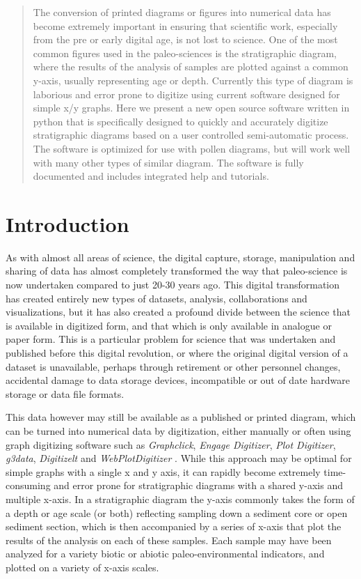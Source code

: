 \documentclass[
11pt, %
english, %
singlespacing, %
headsepline, %
]{MastersDoctoralThesis} %
\begin{document}
\begin{NoHyper}
\begin{refsection}
\setcounter{secnumdepth}{3}

\begin{abstract}
	The conversion of printed diagrams or figures into numerical data has become extremely important in ensuring that scientific work, especially from the pre or early digital age, is not lost to science. One of the most common figures used in the paleo-sciences is the stratigraphic diagram, where the results of the analysis of samples are plotted against a common y-axis, usually representing age or depth. Currently this type of diagram is laborious and error prone to digitize using current software designed for simple x/y graphs. Here we present a new open source software written in python that is specifically designed to quickly and accurately digitize stratigraphic diagrams based on a user controlled semi-automatic process. The software is optimized for use with pollen diagrams, but will work well with many other types of similar diagram. The software is fully documented and includes integrated help and tutorials. 
\end{abstract}

\section{Introduction}   \label{sec:straditize-intro}

As with almost all areas of science, the digital capture, storage, manipulation and sharing of data has almost completely transformed the way that paleo-science is now undertaken compared to just 20-30 years ago. This digital transformation has created entirely new types of datasets, analysis, collaborations and visualizations, but it has also created a profound divide between the science that is available in digitized form, and that which is only available in analogue or paper form. This is a particular problem for science that was undertaken and published before this digital revolution, or where the original digital version of a dataset is unavailable, perhaps through retirement or other personnel changes, accidental damage to data storage devices, incompatible or out of date hardware storage or data file formats. 

This data however may still be available as a published or printed diagram, which can be turned into numerical data by digitization, either manually or often using graph digitizing software such as \emph{Graphclick}, \emph{Engage Digitizer}, \emph{Plot Digitizer}, \emph{g3data}, \emph{Digitizelt} and \emph{WebPlotDigitizer} \citep{Rohatgi2019}. While this approach may be optimal for simple graphs with a single x and y axis, it can rapidly become extremely time-consuming and error prone for stratigraphic diagrams with a shared y-axis and multiple x-axis. In a stratigraphic diagram the y-axis commonly takes the form of a depth or age scale (or both) reflecting sampling down a sediment core or open sediment section, which is then accompanied by a series of x-axis that plot the results of the analysis on each of these samples. Each sample may have been analyzed for a variety biotic or abiotic paleo-environmental indicators, and plotted on a variety of x-axis scales. 


\end{refsection}
\end{NoHyper}
\end{document}
